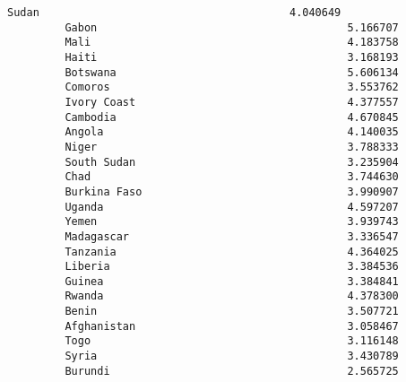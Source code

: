 \documentclass[11pt]{article}
\begin{document}
\begin{Verbatim}[commandchars=\\\{\}]
         Sudan                                       4.040649   
         Gabon                                       5.166707   
         Mali                                        4.183758   
         Haiti                                       3.168193   
         Botswana                                    5.606134   
         Comoros                                     3.553762   
         Ivory Coast                                 4.377557   
         Cambodia                                    4.670845   
         Angola                                      4.140035   
         Niger                                       3.788333   
         South Sudan                                 3.235904   
         Chad                                        3.744630   
         Burkina Faso                                3.990907   
         Uganda                                      4.597207   
         Yemen                                       3.939743   
         Madagascar                                  3.336547   
         Tanzania                                    4.364025   
         Liberia                                     3.384536   
         Guinea                                      3.384841   
         Rwanda                                      4.378300   
         Benin                                       3.507721   
         Afghanistan                                 3.058467   
         Togo                                        3.116148   
         Syria                                       3.430789   
         Burundi                                     2.565725   
         

\end{Verbatim}
\end{document}
